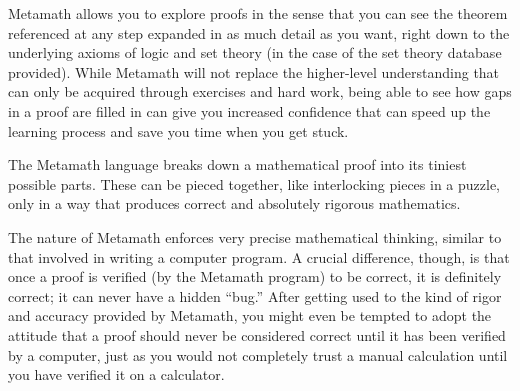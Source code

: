Metamath allows you to explore proofs in the sense that you can see the
theorem referenced at any step expanded in as much detail as you want, right
down to the underlying axioms of logic and set theory (in the case of the set
theory database provided).  While Metamath will not replace the higher-level
understanding that can only be acquired through exercises and hard work, being
able to see how gaps in a proof are filled in can give you increased
confidence that can speed up the learning process and save you time when you
get stuck.

The Metamath language breaks down a mathematical proof into its tiniest
possible parts.  These can be pieced together, like interlocking
pieces in a puzzle, only in a way that produces correct and absolutely rigorous
mathematics.

The nature of Metamath enforces very precise mathematical
thinking, similar to that involved in writing a computer program.  A crucial
difference, though, is that once a proof is verified (by the Metamath program)
to be correct, it is definitely correct; it can never have a hidden
``bug.''  After getting used to the kind of rigor
and accuracy provided by Metamath, you might even be tempted to
adopt the attitude that a proof should never be considered correct until it
has been verified by a computer, just as you would not completely trust a
manual calculation until you have verified it on a
calculator.

